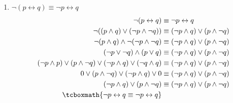\documentclass[10pt,letterpaper]{article}
\begin{document}
\begin{enumerate}
\begin{enumerate}
            \item $\neg (p \leftrightarrow q) \equiv \neg p \leftrightarrow q$
                \begin{equation*} \begin{split} \begin{aligned}
                    \neg (p \leftrightarrow q)
                        &\equiv
                    \neg p \leftrightarrow q \\
                    \neg ((p \land q) \lor (\neg p \land \neg q))
                        &\equiv
                    (\neg p \land q) \lor (p \land \neg q) \\
                    \neg(p \land q) \land \neg(\neg p \land \neg q)
                        &\equiv
                    (\neg p \land q) \lor (p \land \neg q) \\
                    (\neg p \lor \neg q) \land (p \lor q)
                        &\equiv
                    (\neg p \land q) \lor (p \land \neg q) \\
                    (\neg p \land p) \lor (p \land \neg q) \lor (\neg p \land q) \lor (\neg q \land q)
                        &\equiv
                    (\neg p \land q) \lor (p \land \neg q) \\
                    0 \lor (p \land \neg q) \lor (\neg p \land q) \lor 0
                        &\equiv
                    (\neg p \land q) \lor (p \land \neg q) \\
                    (\neg p \land q) \lor (p \land \neg q)
                        &\equiv
                    (\neg p \land q) \lor (p \land \neg q) \\
                    \tcboxmath{\neg p \leftrightarrow q \equiv \neg p \leftrightarrow q} \\
                \end{aligned} \end{split} \end{equation*}


\end{enumerate}
\end{enumerate}
\end{document}
